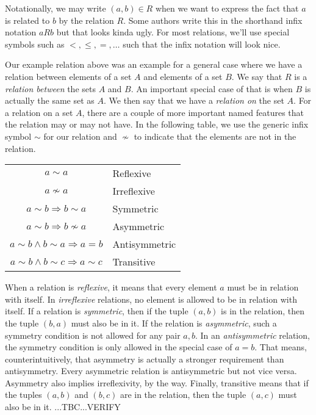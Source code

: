 \medskip
Notationally, we may write $(a,b) \in R$ when we want to express the fact that $a$ is related to $b$ by the relation $R$. Some authors write this in the shorthand infix notation $a R b$ but that looks kinda ugly. For most relations, we'll use special symbols such as $<, \leq, =, \ldots$ such that the infix notation will look nice. 

\medskip
Our example relation above was an example for a general case where we have a relation between elements of a set $A$ and elements of a set $B$. We say that $R$ is a \emph{relation between} the sets $A$ and $B$. An important special case of that is when $B$ is actually the same set as $A$. We then say that we have a \emph{relation on} the set $A$. For a relation on a set $A$, there are a couple of more important named features that the relation may or may not have. In the following table, we use the generic infix symbol $\sim$ for our relation and $\nsim$ to indicate that the elements are not in the relation. 

\medskip
\begin{tabular}{c l}
\label{Tab:RelationFeatures}
  $a \sim a$                                       & Reflexive     \\
  $a \nsim a$                                      & Irreflexive   \\
  $a \sim b \Rightarrow b \sim a$                  & Symmetric     \\
  $a \sim b \Rightarrow b \nsim a$                 & Asymmetric    \\
  $a \sim b \wedge b \sim a \Rightarrow a = b $    & Antisymmetric \\
  $a \sim b \wedge b \sim c \Rightarrow a \sim c$  & Transitive    
\end{tabular}
\medskip

When a relation is \emph{reflexive}, it means that every element $a$ must be in relation with itself. In \emph{irreflexive} relations, no element is allowed to be in relation with itself. If a relation is \emph{symmetric}, then if the tuple $(a,b)$ is in the relation, then the tuple $(b,a)$ must also be in it. If the relation is \emph{asymmetric}, such a symmetry condition is not allowed for any pair $a,b$. In an \emph{antisymmetric} relation, the symmetry condition is only allowed in the special case of $a = b$. That means, counterintuitively, that asymmetry is actually a stronger requirement than antisymmetry. Every asymmetric relation is antisymmetric but not vice versa. Asymmetry also implies irreflexivity, by the way. Finally, transitive means that if the tuples $(a,b)$ and $(b,c)$ are in the relation, then the tuple $(a,c)$ must also be in it. 
...TBC...VERIFY

